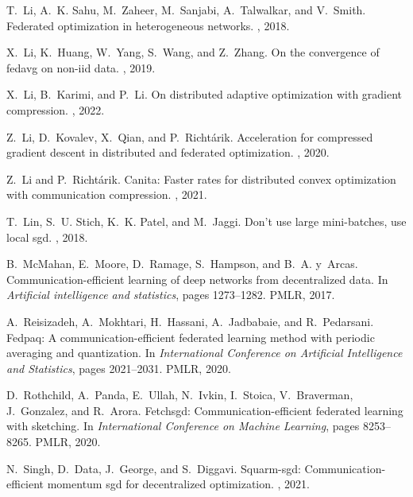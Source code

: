 \documentclass[11pt]{article}
\begin{document}
\begin{thebibliography}{10}
T.~Li, A.~K. Sahu, M.~Zaheer, M.~Sanjabi, A.~Talwalkar, and V.~Smith.
\newblock Federated optimization in heterogeneous networks.
, 2018.

X.~Li, K.~Huang, W.~Yang, S.~Wang, and Z.~Zhang.
\newblock On the convergence of fedavg on non-iid data.
, 2019.

X.~Li, B.~Karimi, and P.~Li.
\newblock On distributed adaptive optimization with gradient compression.
, 2022.

Z.~Li, D.~Kovalev, X.~Qian, and P.~Richt{\'a}rik.
\newblock Acceleration for compressed gradient descent in distributed and
  federated optimization.
, 2020.

Z.~Li and P.~Richt{\'a}rik.
\newblock Canita: Faster rates for distributed convex optimization with
  communication compression.
, 2021.

T.~Lin, S.~U. Stich, K.~K. Patel, and M.~Jaggi.
\newblock Don't use large mini-batches, use local sgd.
, 2018.

B.~McMahan, E.~Moore, D.~Ramage, S.~Hampson, and B.~A. y~Arcas.
\newblock Communication-efficient learning of deep networks from decentralized
  data.
\newblock In {\em Artificial intelligence and statistics}, pages 1273--1282.
  PMLR, 2017.

A.~Reisizadeh, A.~Mokhtari, H.~Hassani, A.~Jadbabaie, and R.~Pedarsani.
\newblock Fedpaq: A communication-efficient federated learning method with
  periodic averaging and quantization.
\newblock In {\em International Conference on Artificial Intelligence and
  Statistics}, pages 2021--2031. PMLR, 2020.

D.~Rothchild, A.~Panda, E.~Ullah, N.~Ivkin, I.~Stoica, V.~Braverman,
  J.~Gonzalez, and R.~Arora.
\newblock Fetchsgd: Communication-efficient federated learning with sketching.
\newblock In {\em International Conference on Machine Learning}, pages
  8253--8265. PMLR, 2020.

N.~Singh, D.~Data, J.~George, and S.~Diggavi.
\newblock Squarm-sgd: Communication-efficient momentum sgd for decentralized
  optimization.
, 2021.


\end{thebibliography}
\end{document}
